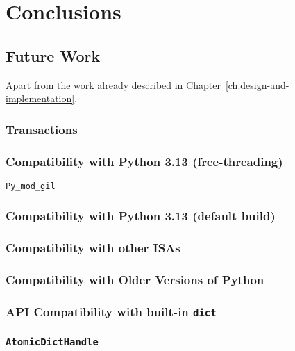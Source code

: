 \chapter{Conclusions}\label{ch:conclusions}

\section{Future Work}\label{sec:future-work}

Apart from the work already described in Chapter~\ref{ch:design-and-implementation}.

\subsection{Transactions}\label{subsec:transactions}

\subsection{Compatibility with Python 3.13 (free-threading)}\label{subsec:compatibility-with-3.13-free-threading}

\texttt{Py\_mod\_gil}

\subsection{Compatibility with Python 3.13 (default build)}\label{subsec:compatibility-with-3.13-default-build}

\subsection{Compatibility with other ISAs}\label{subsec:compatibility-with-other-isas}

\subsection{Compatibility with Older Versions of Python}\label{subsec:compatibility-with-older-versions-of-python}

\subsection{API Compatibility with built-in \texttt{dict}}\label{subsec:api-compatibility-with-dict}

\subsection{\texttt{AtomicDictHandle}}\label{subsec:atomicdicthandle}

